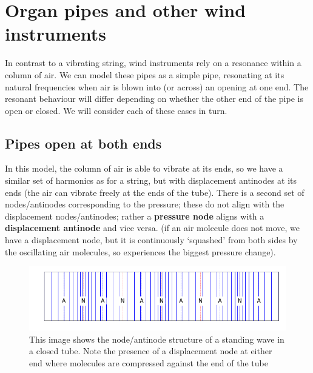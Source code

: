 \documentclass[
]{book}
\begin{document}
\hypertarget{sec:ch10-pipesandwindinstruments}{%
\section{Organ pipes and other wind instruments}\label{sec:ch10-pipesandwindinstruments}}

In contrast to a vibrating string, wind instruments rely on a resonance within a column of air. We can model these pipes as a simple pipe, resonating at its natural frequencies when air is blown into (or across) an opening at one end. The resonant behaviour will differ depending on whether the other end of the pipe is open or closed. We will consider each of these cases in turn.

\hypertarget{pipes-open-at-both-ends}{%
\subsection{Pipes open at both ends}\label{pipes-open-at-both-ends}}

In this model, the column of air is able to vibrate at its ends, so we have a similar set of harmonics as for a string, but with displacement antinodes at its ends (the air can vibrate freely at the ends of the tube). There is a second set of nodes/antinodes corresponding to the pressure; these do not align with the displacement nodes/antinodes; rather a \textbf{pressure node} aligns with a \textbf{displacement antinode} and vice versa. (if an air molecule does not move, we have a displacement node, but it is continuously `squashed' from both sides by the oscillating air molecules, so experiences the biggest pressure change).

\begin{figure}

{\centering \includegraphics[width=0.7\linewidth]{visualisations/ch10-longitudinal-standingwave-n6closed} 

}

\caption{This image shows the node/antinode structure of a standing wave in a closed tube. Note the presence of a displacement node at either end where molecules are compressed against the end of the tube }\label{fig:ch10-waves-closedtube}
\end{figure}
\end{document}
